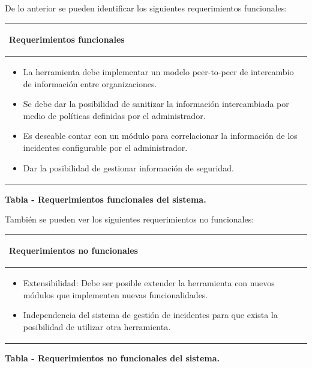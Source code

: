 \bigskip
\newpage
	De lo anterior se pueden identificar los siguientes requerimientos funcionales:
\begin{flushleft}
	\tablefirsthead{}
	\tablehead{}
	\tabletail{}
	\tablelasttail{}
	\begin{supertabular}{|m{5.83516in}|}
		\hline
		\begin{center}{\bfseries Requerimientos funcionales}
		\end{center}
		\\\hline
		\begin{itemize}
			\item {La herramienta debe implementar un modelo peer-to-peer de intercambio de
				información entre organizaciones.}
			\item {Se debe dar la posibilidad de sanitizar la información intercambiada por medio
				de políticas definidas por el administrador.}
			\item {Es deseable contar con un módulo para correlacionar la información de los
				incidentes configurable por el administrador.}
			\item {Dar la posibilidad de gestionar información de seguridad.}
		\end{itemize}
		\\\hline
	\end{supertabular}
\end{flushleft}
{\centering{}\bfseries
	\foreignlanguage{spanish}{Tabla }\foreignlanguage{spanish}{ - Requerimientos funcionales
		del sistema.}
	\par}
\bigskip
	También se pueden ver los siguientes requerimientos no funcionales:

\begin{flushleft}
	\tablefirsthead{}
	\tablehead{}
	\tabletail{}
	\tablelasttail{}
	\begin{supertabular}{|m{5.83516in}|}
		\hline
		\begin{center}{\bfseries Requerimientos no funcionales}
		\end{center}
		\\\hline
		\begin{itemize}
			\item {Extensibilidad: Debe ser posible extender la herramienta con nuevos módulos que
				implementen nuevas funcionalidades.}
			\item {Independencia del sistema de gestión de incidentes para que exista la posibilidad de
				utilizar otra herramienta.}
		\end{itemize}
		\\\hline
	\end{supertabular}
\end{flushleft}
{\centering{}\bfseries
	\foreignlanguage{spanish}{Tabla }\foreignlanguage{spanish}{ - Requerimientos no
		funcionales del sistema.}
	\par}


